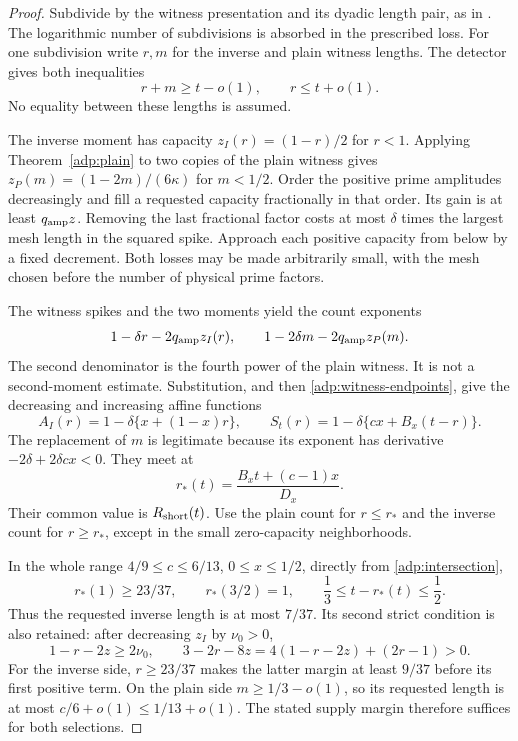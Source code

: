 \begin{proof}
Subdivide by the witness presentation and its dyadic length pair,
as in \cite[Proposition 19.2]{OAI26}. The logarithmic number of
subdivisions is absorbed in the prescribed loss. For one subdivision
write $r,m$ for the inverse and plain witness lengths. The detector
gives both inequalities
\begin{equation}\label{adp:witness-endpoints}
 r+m\ge t-o(1),\qquad r\le t+o(1).
\end{equation}
No equality between these lengths is assumed.

The inverse moment \cite[Lemma 17.1]{OAI26} has capacity
$z_I(r)=(1-r)/2$ for $r<1$. Applying Theorem~\ref{adp:plain}
to two copies of the plain witness gives
$z_P(m)=(1-2m)/(6\kappa)$ for $m<1/2$.
Order the positive prime amplitudes decreasingly and fill a requested
capacity fractionally in that order. Its gain is at least
$q_{\rm amp}z$. Removing the last fractional factor costs at most
$\delta$ times the largest mesh length in the squared spike.
Approach each positive capacity from below by a fixed decrement.
Both losses may be made arbitrarily small, with the mesh chosen
before the number of physical prime factors.

The witness spikes and the two moments yield the count exponents
\[
 1-\delta r-2q_{\rm amp}z_I(r),\qquad
 1-2\delta m-2q_{\rm amp}z_P(m).
\]
The second denominator is the fourth power of the plain witness.
It is not a second-moment estimate. Substitution, and then
\eqref{adp:witness-endpoints}, give the decreasing and increasing
affine functions
\[
 A_I(r)=1-\delta\{x+(1-x)r\},\qquad
 S_t(r)=1-\delta\{cx+B_x(t-r)\}.
\]
The replacement of $m$ is legitimate because its exponent has
derivative $-2\delta+2\delta cx<0$.
They meet at
\begin{equation}\label{adp:intersection}
 r_*(t)=\frac{B_xt+(c-1)x}{D_x}.
\end{equation}
Their common value is $R_{\rm short}(t)$.
Use the plain count for $r\le r_*$ and the inverse count for
$r\ge r_*$, except in the small zero-capacity neighborhoods.

In the whole range $4/9\le c\le6/13$, $0\le x\le1/2$,
directly from \eqref{adp:intersection},
\[
 r_*(1)\ge23/37,\qquad r_*(3/2)=1,\qquad
 \frac13\le t-r_*(t)\le\frac12 .
\]
Thus the requested inverse length is at most $7/37$. Its second
strict condition is also retained: after decreasing $z_I$ by
$\nu_0>0$,
\[
 1-r-2z\ge2\nu_0,\qquad
 3-2r-8z=4(1-r-2z)+(2r-1)>0.
\]
For the inverse side, $r\ge23/37$ makes the latter margin at least
$9/37$ before its first positive term.
On the plain side $m\ge1/3-o(1)$, so its requested length is at
most $c/6+o(1)\le1/13+o(1)$.
The stated supply margin therefore suffices for both selections.


\end{proof}
